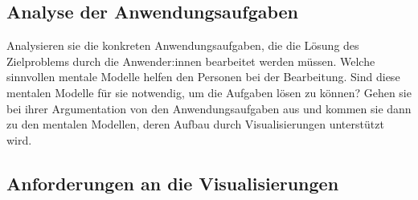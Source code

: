 \documentclass[usegeometry=true]{scrartcl}
\begin{document}
\subsection{Analyse der Anwendungsaufgaben}

Analysieren sie die konkreten Anwendungsaufgaben, die die Lösung des Zielproblems durch die Anwender:innen bearbeitet werden müssen. 
Welche sinnvollen mentale Modelle helfen den Personen bei der Bearbeitung. 
Sind diese mentalen Modelle für sie notwendig, um die Aufgaben lösen zu können? Gehen sie bei ihrer Argumentation von den Anwendungsaufgaben aus und kommen sie dann zu den mentalen Modellen, deren Aufbau durch Visualisierungen unterstützt wird. 
\subsection{Anforderungen an die Visualisierungen}
\end{document}
